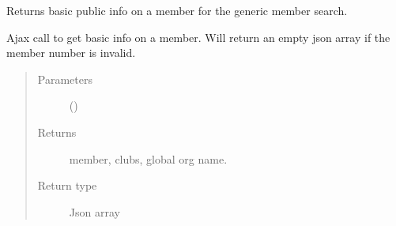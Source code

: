 \documentclass[letterpaper,10pt,english]{sphinxmanual}
\begin{document}

\begin{fulllineitems}
\label{\detokenize{accounts:accounts.views.member_details_ajax}}
Returns basic public info on a member for the generic member search.

Ajax call to get basic info on a member. Will return an empty json array
if the member number is invalid.
\begin{quote}\begin{description}
\item[{Parameters}] \leavevmode
{} () \textendash{} 

\item[{Returns}] \leavevmode
member, clubs,  global org name.

\item[{Return type}] \leavevmode
Json array

\end{description}\end{quote}

\end{fulllineitems}

\end{document}
